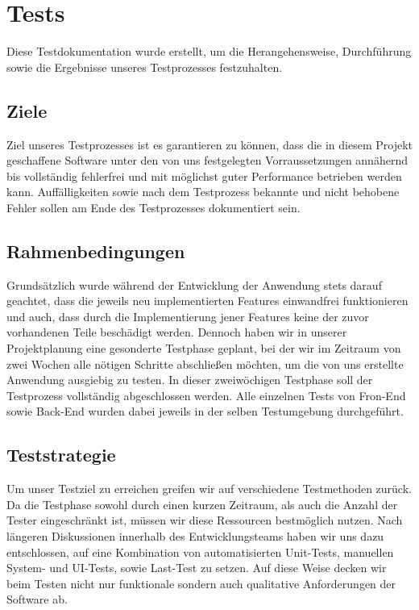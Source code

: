 \chapter{Tests}
Diese Testdokumentation wurde erstellt, um die Herangehensweise, Durchführung sowie die Ergebnisse unseres Testprozesses festzuhalten. 

\section{Ziele}
Ziel unseres Testprozesses ist es garantieren zu können, dass die in diesem Projekt geschaffene Software unter den von uns festgelegten Vorraussetzungen annähernd bis vollständig fehlerfrei und mit möglichst guter Performance betrieben werden kann. Auffälligkeiten sowie nach dem Testprozess bekannte und nicht behobene Fehler sollen am Ende des Testprozesses dokumentiert sein.

\section{Rahmenbedingungen}
Grundsätzlich wurde während der Entwicklung der Anwendung stets darauf geachtet, dass die jeweils neu implementierten Features einwandfrei funktionieren und auch, dass durch die Implementierung jener Features keine der zuvor vorhandenen Teile beschädigt werden. Dennoch haben wir in unserer Projektplanung eine gesonderte Testphase geplant, bei der wir im Zeitraum von zwei Wochen alle nötigen Schritte abschließen möchten, um die von uns erstellte Anwendung ausgiebig zu testen. In dieser zweiwöchigen Testphase soll der Testprozess vollständig abgeschlossen werden. Alle einzelnen Tests von Fron-End sowie Back-End wurden dabei jeweils in der selben Testumgebung durchgeführt.

\section{Teststrategie}
Um unser Testziel zu erreichen greifen wir auf verschiedene Testmethoden zurück. Da die Testphase sowohl durch einen kurzen Zeitraum, als auch die Anzahl der Tester eingeschränkt ist, müssen wir diese Ressourcen bestmöglich nutzen. Nach längeren Diskussionen innerhalb des Entwicklungsteams haben wir uns dazu entschlossen, auf eine Kombination von automatisierten Unit-Tests, manuellen System- und UI-Tests, sowie Last-Test zu setzen. Auf diese Weise decken wir beim Testen nicht nur funktionale sondern auch qualitative Anforderungen der Software ab.

